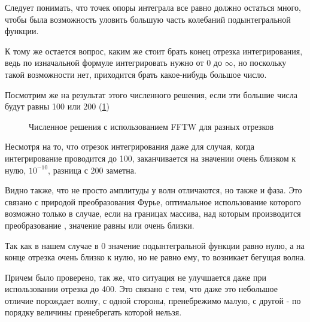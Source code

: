 \documentclass[14pt]{extarticle}
\begin{document}
Следует понимать, что точек опоры интеграла все равно должно остаться много, чтобы была возможность уловить большую часть колебаний подынтегральной функции.

К тому же остается вопрос, каким же стоит брать конец отрезка интегрирования, ведь по изначальной формуле интегрировать нужно от 0 до $\infty$, но поскольку такой возможности нет, приходится брать какое-нибудь большое число.

Посмотрим же на результат этого численного решения, если эти большие числа будут равны 100 или 200 (\ref{ris:fftw_compare})

\begin{figure}[h]
	\caption{Численное решения с использованием FFTW для разных отрезков}
	\label{ris:fftw_compare}
\end{figure}

Несмотря на то, что отрезок интегрирования даже для случая, когда интегрирование проводится до 100, заканчивается на значении очень близком к нулю, $10^{-10}$, разница с 200 заметна.

Видно также, что не просто амплитуды у волн отличаются, но также и фаза. Это связано с природой преобразования Фурье, оптимальное использование которого возможно только в случае, если на границах массива, над которым производится преобразование , значение равны или очень близки. 

Так как в нашем случае в 0 значение подынтегральной функции равно нулю, а на конце отрезка очень близко к нулю, но не равно ему, то возникает бегущая волна.

Причем было проверено, так же, что ситуация не улучшается даже при использовании отрезка до 400. Это связано с тем, что даже это небольшое отличие порождает волну, с одной стороны, пренебрежимо малую, с другой - по порядку величины пренебрегать которой нельзя. 
\end{document}
